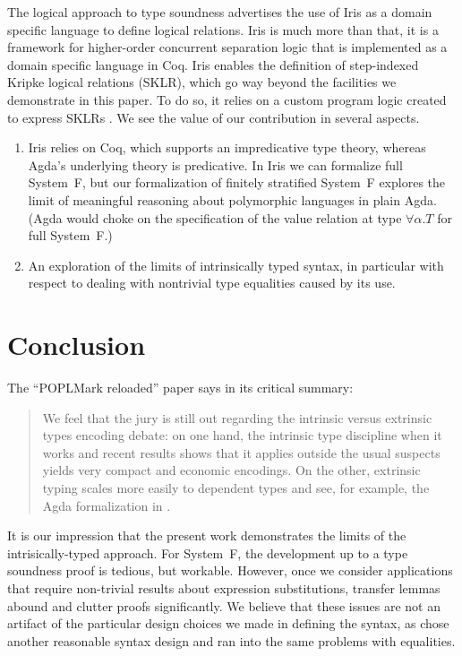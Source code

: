 \documentclass[sigplan,anonymous,review,screen]{acmart}
\begin{document}
The logical approach to type soundness
\cite{timany24:_logic_approac_type_sound} advertises the use of Iris
as a domain specific language to define logical relations. Iris
\cite{DBLP:journals/jfp/JungKJBBD18} is much more than that, it is a
framework for higher-order concurrent separation logic that is
implemented as a domain specific language in Coq.
Iris enables the definition of step-indexed Kripke logical relations (SKLR),
which go way beyond the facilities we demonstrate in this paper.
To do so, it relies on a custom program logic created to express SKLRs
\cite{DBLP:journals/corr/abs-1103-0510}. 
We see the value of our contribution in several aspects.
\begin{enumerate}
\item Iris relies on Coq, which supports an impredicative type
  theory, whereas Agda's underlying theory is predicative. In Iris we
  can formalize full System~F, but our
  formalization of finitely stratified System~F explores the limit of
  meaningful reasoning about polymorphic languages in plain Agda.
  (Agda would choke on the specification of the value relation at type
  $\forall\alpha.T$ for full System~F.)
\item An exploration of the limits of intrinsically typed syntax, in
  particular with respect to dealing with nontrivial type equalities
  caused by its use.
\end{enumerate}

\section{Conclusion}
\label{sec:conclusion}
\label{sec:future-work}

The ``POPLMark reloaded'' paper \cite[Section 5.1]{DBLP:journals/jfp/AbelAHPMSS19}
says in its critical summary:
\begin{quotation}
  We feel that the jury is still out regarding the intrinsic versus
  extrinsic types encoding debate: on one hand, the intrinsic type
  discipline when it works \textemdash{} and recent results
  \cite{DBLP:journals/pacmpl/PoulsenRTKV18} shows that it applies
  outside the usual suspects \textemdash{} yields very compact and economic
  encodings. On the other, extrinsic typing scales more easily to
  dependent types
  \cite{DBLP:conf/types/Danielsson06,DBLP:journals/entcs/Chapman09,DBLP:conf/popl/AltenkirchK16}
  and see, for example, the Agda formalization in \citet{DBLP:journals/pacmpl/0001OV18}. 
\end{quotation}
It is our impression that the present work demonstrates the limits of
the intrisically-typed approach. For System~F, the development up to a
type soundness proof is tedious, but workable. However, once we
consider applications that require non-trivial results about
expression substitutions, transfer lemmas abound and clutter proofs
significantly. We believe that these issues are not an artifact of the
particular design choices we made in defining the syntax, as
\citet{DBLP:journals/jar/BentonHKM12} chose another reasonable syntax
design and ran into the same problems with equalities.
\end{document}
